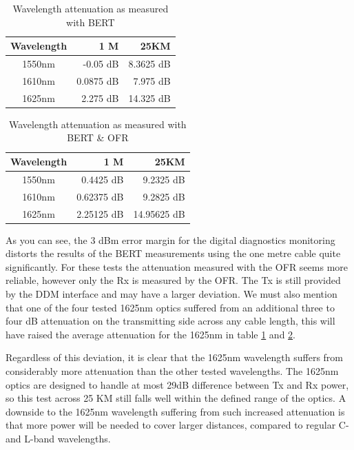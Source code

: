\documentclass{article}
\begin{document}
\begin{table}[h]
\centering
\label{tab:attenuation-table-ber}
\begin{tabular}{|c|r|r|}
\hline 
\textbf{Wavelength} & \textbf{1 M} & \textbf{25KM}\\ 
\hline 
1550nm & -0.05 dB & 8.3625 dB\\ 
\hline 
1610nm & 0.0875 dB & 7.975 dB\\ 
\hline 
1625nm & 2.275 dB & 14.325 dB\\
\hline
\end{tabular} 
\caption{Wavelength attenuation as measured with BERT}
\end{table}

\begin{table}[h]
\centering
\label{tab:attenuation-table-ofr}
\begin{tabular}{|c|r|r|}
\hline 
\textbf{Wavelength} & \textbf{1 M} & \textbf{25KM}\\ 
\hline 
1550nm & 0.4425 dB & 9.2325 dB\\ 
\hline 
1610nm & 0.62375 dB & 9.2825 dB\\ 
\hline 
1625nm & 2.25125 dB & 14.95625 dB\\
\hline
\end{tabular}
\caption{Wavelength attenuation as measured with BERT \& OFR}
\end{table}

As you can see, the 3 dBm error margin for the digital diagnostics monitoring distorts the results of the BERT measurements using the one metre cable quite significantly.
For these tests the attenuation measured with the OFR seems more reliable, however only the Rx is measured by the OFR.
The Tx is still provided by the DDM interface and may have a larger deviation.
We must also mention that one of the four tested 1625nm optics suffered from an additional three to four dB attenuation on the transmitting side across any cable length, this will have raised the average attenuation for the 1625nm in table \ref{tab:attenuation-table-ber} and \ref{tab:attenuation-table-ofr}.

Regardless of this deviation, it is clear that the 1625nm wavelength suffers from considerably more attenuation than the other tested wavelengths.
The 1625nm optics are designed to handle at most 29dB difference between Tx and Rx power, so this test across 25 KM still falls well within the defined range of the optics.
A downside to the 1625nm wavelength suffering from such increased attenuation is that more power will be needed to cover larger distances, compared to regular C- and L-band wavelengths. \\
\end{document}
